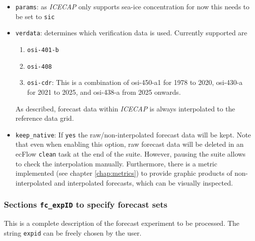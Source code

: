 \documentclass[DIV=10, parskip=full]{scrreprt}
\newcommand{\ice}{\textit{ICECAP}\xspace}
\begin{document}
\begin{itemize}
 \item \texttt{params}: as \ice only supports sea-ice concentration for now this needs to be set to \texttt{sic}
 \item \texttt{verdata}: determines which verification data is used. Currently supported are
 \begin{enumerate}
 	\item \texttt{osi-401-b}
 	\item \texttt{osi-408}
 	\item \texttt{osi-cdr}: This is a combination of osi-450-a1 for 1978 to 2020, osi-430-a for 2021 to 2025, and osi-438-a from 2025 onwards.
 \end{enumerate}
As described, forecast data within \ice is always interpolated to the reference data grid. 


  \item \texttt{keep\_native}: If \texttt{yes} the raw/non-interpolated forecast data will be kept. Note that even when enabling this option, raw forecast data will be deleted in an ecFlow \texttt{clean} task at the end of the suite. However, pausing the suite allows to check the interpolation manually. Furthermore, there is a metric implemented (see chapter \ref{chap:metrics}) to provide graphic products of non-interpolated and interpolated forecasts, which can be visually inspected. 
\end{itemize}

\subsubsection{Sections \texttt{fc\_expID} to specify forecast sets} \label{sec:config_fcsets}
This is a complete description of the forecast experiment to be processed. The string \texttt{expid} can be freely chosen by the user.
\end{document}

